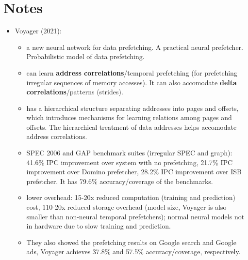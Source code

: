 \documentclass [12pt]{article}
\begin{document}
        

    \section{Notes}
        \begin{itemize}
            \item Voyager (2021): 
                \begin{itemize}
                    \item a new neural network for data prefetching. A practical neural prefetcher. Probabilistic model of data prefetching. 
                    \item can learn \textbf{address correlations}/temporal prefetching (for prefetching irregular sequences of memory accesses). It can also accomodate \textbf{delta correlations}/patterns (strides).
                    \item has a hierarchical structure separating addresses into pages and offsets, which introduces mechanisms for learning relations among pages and offsets. The hierarchical treatment of data addresses helps accomodate address correlations.
                    \item SPEC 2006 and GAP benchmark suites (irregular SPEC and graph): 41.6\% IPC improvement over system with no prefetching, 21.7\% IPC improvement over Domino prefetcher, 28.2\% IPC improvement over ISB prefetcher. It has 79.6\% accuracy/coverage of the benchmarks.
                    \item lower overhead: 15-20x reduced computation (training and prediction) cost, 110-20x reduced storage overhead (model size, Voyager is also smaller than non-neural temporal prefetchers); normal neural models not in hardware due to slow training and prediction.
                    \item They also showed the prefetching results on Google search and Google ads, Voyager achieves 37.8\% and 57.5\% accuracy/coverage, respectively.
                \end{itemize}
            

\end{itemize}
\end{document}
